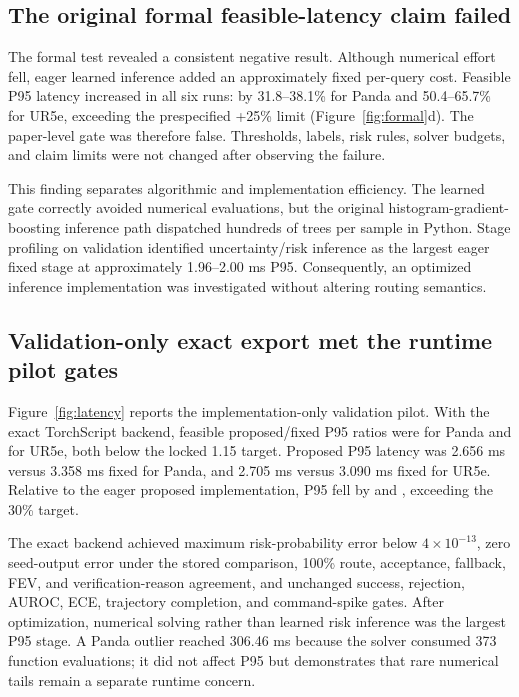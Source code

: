 \documentclass[10pt,a4paper]{article}
\begin{document}
\subsection{The original formal feasible-latency claim failed}

The formal test revealed a consistent negative result. Although numerical effort fell,
eager learned inference added an approximately fixed per-query cost. Feasible P95
latency increased in all six runs: by 31.8--38.1\% for Panda and 50.4--65.7\% for
UR5e, exceeding the prespecified +25\% limit (Figure~\ref{fig:formal}d). The
paper-level gate was therefore false. Thresholds, labels, risk rules, solver budgets,
and claim limits were not changed after observing the failure.

This finding separates algorithmic and implementation efficiency. The learned gate
correctly avoided numerical evaluations, but the original histogram-gradient-boosting
inference path dispatched hundreds of trees per sample in Python. Stage profiling on
validation identified uncertainty/risk inference as the largest eager fixed stage at
approximately 1.96--2.00 ms P95. Consequently, an optimized inference implementation
was investigated without altering routing semantics.

\subsection{Validation-only exact export met the runtime pilot gates}

Figure~\ref{fig:latency} reports the implementation-only validation pilot. With the
exact TorchScript backend, feasible proposed/fixed P95 ratios were
\PandaPilotRatio{} for Panda and \URPilotRatio{} for UR5e, both below the locked 1.15
target. Proposed P95 latency was 2.656 ms versus 3.358 ms fixed for Panda, and 2.705 ms
versus 3.090 ms fixed for UR5e. Relative to the eager proposed implementation, P95 fell
by \PandaPilotReduction{} and \URPilotReduction{}, exceeding the 30\% target.

The exact backend achieved maximum risk-probability error below
$4\times10^{-13}$, zero seed-output error under the stored comparison, 100\% route,
acceptance, fallback, FEV, and verification-reason agreement, and unchanged success,
rejection, AUROC, ECE, trajectory completion, and command-spike gates. After
optimization, numerical solving rather than learned risk inference was the largest P95
stage. A Panda outlier reached 306.46 ms because the solver consumed 373 function
evaluations; it did not affect P95 but demonstrates that rare numerical tails remain a
separate runtime concern.
\end{document}
